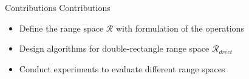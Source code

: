 \begin{frame}{Contributions}
Contributions
\begin{itemize}
\item Define the range space $\mathcal{R}$ with formulation of the operations
\item Design algorithms for double-rectangle range space $\mathcal{R}_{drect}$
\item Conduct experiments to evaluate different range spaces
\end{itemize}
\end{frame}